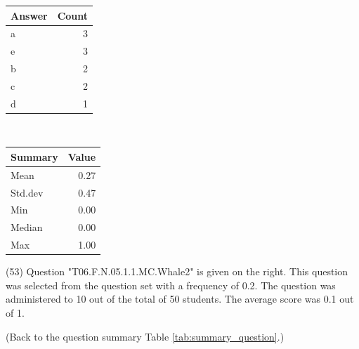 \documentclass[12pt,english,nohyper]{tufte-handout}\usepackage[]{graphicx}\usepackage[]{color}
\begin{document}
\begin{center}%
\begin{tabular}{lr}
  \hline
Answer & Count \\ 
  \hline
a &   3 \\ 
  e &   3 \\ 
  b &   2 \\ 
  c &   2 \\ 
  d &   1 \\ 
   \hline
\end{tabular}
~~~~~~~~%
\begin{tabular}{lr}
  \hline
Summary & Value \\ 
  \hline
Mean & 0.27 \\ 
  Std.dev & 0.47 \\ 
  Min & 0.00 \\ 
  Median & 0.00 \\ 
  Max & 1.00 \\ 
   \hline
\end{tabular}
\end{center}\newpage{} (53) Question "T06.F.N.05.1.1.MC.Whale2" is given on the right. This question was selected from the question set with a frequency of 0.2. The question was administered to 10 out of the total of 50 students. The average score was 0.1 out of 1.

 (Back to the question summary Table \ref{tab:summary_question}.)
\end{document}

